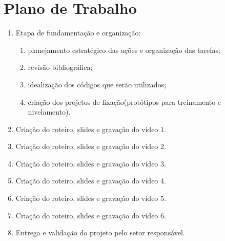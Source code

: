 \documentclass[a4paper,10pt]{article} %
\begin{document}



\section{Plano de Trabalho}

 \begin{enumerate}
  \item Etapa de fundamentação e organização:
      \begin{enumerate}
         \item planejamento estratégico das ações e organização das tarefas;
         \item revisão bibliográfica;
         \item idealização dos códigos que serão utilizados;
         \item criação dos projetos de fixação(protótipos para treinamento e nivelamento).    
      \end{enumerate}    
  \item Criação do roteiro, slides e gravação do vídeo 1.
  \item Criação do roteiro, slides e gravação do vídeo 2.
  \item Criação do roteiro, slides e gravação do vídeo 3.
  \item Criação do roteiro, slides e gravação do vídeo 4.
  \item Criação do roteiro, slides e gravação do vídeo 5.
  \item Criação do roteiro, slides e gravação do vídeo 6.
  \item Entrega e validação do projeto pelo setor responsável.
\end{enumerate}
\end{document}
